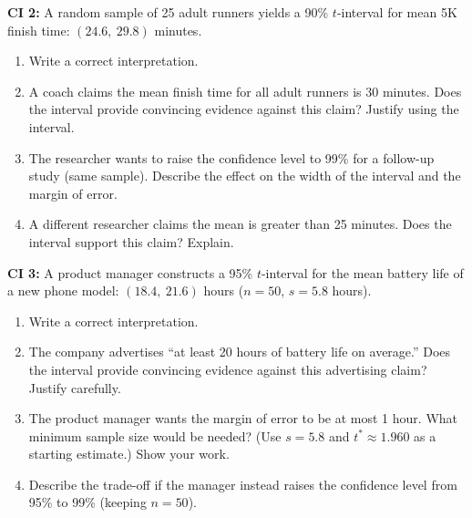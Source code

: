 \documentclass[10pt]{article}
\begin{document}
\begin{tcolorbox}[colback=white, colframe=black!40, title=\textbf{Tier A --- Approaching Proficiency},
    fonttitle=\bfseries, arc=2mm, left=3mm, right=3mm, top=2mm, bottom=2mm]

\textbf{CI 2:} A random sample of 25 adult runners yields a 90\% $t$-interval for
mean 5K finish time: $\mathbf{(24.6,\ 29.8)}$ minutes.

\begin{enumerate}[label=\alph*.]
  \item Write a correct interpretation. 

  \item A coach claims the mean finish time for all adult runners is 30 minutes.
        Does the interval provide convincing evidence against this claim? Justify
        using the interval. 

  \item The researcher wants to raise the confidence level to 99\% for a follow-up
        study (same sample). Describe the effect on the width of the interval and
        the margin of error. 

  \item A different researcher claims the mean is greater than 25 minutes. Does the
        interval support this claim? Explain. 
\end{enumerate}
\end{tcolorbox}

\begin{tcolorbox}[colback=white, colframe=black!40, title=\textbf{Tier E --- Extension},
    fonttitle=\bfseries, arc=2mm, left=3mm, right=3mm, top=2mm, bottom=2mm]

\textbf{CI 3:} A product manager constructs a 95\% $t$-interval for the mean battery
life of a new phone model: $\mathbf{(18.4,\ 21.6)}$ hours ($n = 50$, $s = 5.8$ hours).

\begin{enumerate}[label=\alph*.]
  \item Write a correct interpretation. 

  \item The company advertises ``at least 20 hours of battery life on average.''
        Does the interval provide convincing evidence against this advertising claim?
        Justify carefully. 

  \item The product manager wants the margin of error to be at most 1 hour. What
        minimum sample size would be needed? (Use $s = 5.8$ and $t^* \approx 1.960$
        as a starting estimate.) Show your work. 

  \item Describe the trade-off if the manager instead raises the confidence level
        from 95\% to 99\% (keeping $n = 50$). 
\end{enumerate}
\end{tcolorbox}
\end{document}
